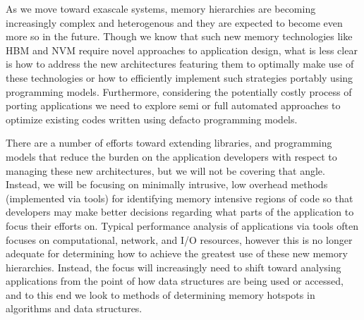 As we move toward exascale systems, memory hierarchies are becoming increasingly complex and heterogenous and they are expected to become even more so in the future.
Though we know that such new memory technologies like \ac{HBM} and \ac{NVM} require novel approaches to application design, what is less clear is how to address the new architectures featuring them to optimally make use of these technologies or how to efficiently implement such strategies portably using programming models.
Furthermore, considering the potentially costly process of porting applications we need to explore semi or full automated approaches to optimize existing codes written using defacto programming models.

There are a number of efforts toward extending libraries, and programming models that reduce the burden on the application developers with respect to managing these new architectures, but we will not be covering that angle. 
Instead, we will be focusing on  minimally intrusive, low overhead methods (implemented via tools) for identifying memory intensive regions of code so that developers may make better decisions regarding what parts of the application to focus their efforts on.
Typical performance analysis of applications via tools often focuses on computational, network, and I/O resources, however this is no longer adequate for determining how to achieve the greatest use of these new memory hierarchies.
Instead, the focus will increasingly need to shift toward analysing applications from the point of how data structures are being used or accessed, and to this end we look to methods of determining memory hotspots in algorithms and data structures.


